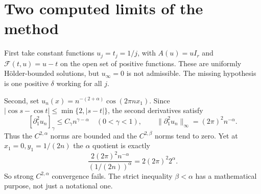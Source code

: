 \documentclass[12pt,reqno]{amsart}
\begin{document}
\section{Two computed limits of the method}
First take constant functions $u_j=t_j=1/j$, with $A(u)=uI_r$ and
$\mathcal F(t,u)=u-t$ on the open set of positive functions. These are
uniformly H\"older-bounded solutions, but $u_\infty=0$ is not admissible.
The missing hypothesis is one positive $\delta$ working for all $j$.

Second, set $u_n(x)=n^{-(2+\alpha)}\cos(2\pi n x_1)$. Since
$|\cos s-\cos t|\leq\min\{2,|s-t|\}$, the second derivatives satisfy
\[
 [\partial_1^2u_n]_\gamma\leq C_\gamma n^{\gamma-\alpha}
 \quad(0<\gamma<1),\qquad
 \|\partial_1^2u_n\|_\infty=(2\pi)^2n^{-\alpha}.
\]
Thus the $C^{2,\alpha}$ norms are bounded and the $C^{2,\beta}$ norms tend
to zero. Yet at $x_1=0,y_1=1/(2n)$ the $\alpha$ quotient is exactly
\[
 \frac{2(2\pi)^2n^{-\alpha}}{(1/(2n))^\alpha}
 =2(2\pi)^2 2^\alpha.
\]
So strong $C^{2,\alpha}$ convergence fails. The strict inequality
$\beta<\alpha$ has a mathematical purpose, not just a notational one.

\nocite{S-guide}


\end{document}
